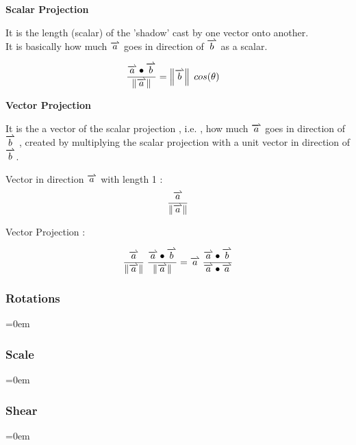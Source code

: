 
\textbf{Scalar Projection}

It is the length (scalar) of the 'shadow' cast by one vector onto another.\\

It is basically how much \( \harpoon{a} \) goes in direction of \( \harpoon{b} \) as a scalar.

\[
\begin{aligned}
	\frac{\harpoon{a} \bullet \harpoon{b}}{\left\|\harpoon{a}\right\|} & = \left\|\harpoon{b}\right\| \; cos(\theta)
\end{aligned}
\]

\textbf{Vector Projection}

It is the a vector of the scalar projection , i.e. , how much \( \harpoon{a} \) goes in direction of \( \harpoon{b} \) , created by multiplying the scalar projection with a unit vector in direction of \( \harpoon{b} \).

Vector in direction \( \harpoon{a} \) with length 1 :
\[
	\frac{\harpoon{a}}{\left\| \harpoon{a} \right\|} 
\]

Vector Projection :

\[
\begin{aligned}
	\frac{\harpoon{a}}{\left\| \harpoon{a} \right\|} \; \frac{\harpoon{a} \bullet \harpoon{b}}{\left\|\harpoon{a}\right\|} 
	& = \harpoon{a} \; \frac{\harpoon{a} \bullet \harpoon{b}}{\harpoon{a} \bullet \harpoon{a}} \\
\end{aligned}
\]





\subsubsectionend
\subsubsection{Rotations}
\label{sssec:rotations}
\parindent=0em



\subsubsectionend
\subsubsection{Scale}
\label{sssec:scale}
\parindent=0em



\subsubsectionend
\subsubsection{Shear}
\label{sssec:shear}
\parindent=0em



